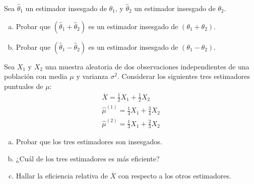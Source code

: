 \documentclass[12pt]{article}\usepackage[]{graphicx}\usepackage[]{color}
\begin{document}
\begin{prob}
Sea $\hat{\theta}_{1}$ un estimador insesgado de $\theta_{1}$, y
$\hat{\theta}_{2}$ un estimador insesgado de $\theta_{2}$.
\begin{enumerate}[a)]
\item Probar que $(\hat{\theta}_{1}+\hat{\theta}_{2})$ es un
estimador insesgado de $(\theta_{1}+\theta_{2})$.
\item  Probar que $(\hat{\theta}_{1}-\hat{\theta}_{2})$ es un
estimador insesgado de $(\theta_{1}-\theta_{2})$.
\end{enumerate}
\end{prob}

\begin{prob}
Sea $X_{1}$ y $X_{2}$ una muestra aleatoria de dos observaciones
independientes de
una población con media $\mu$ y varianza $\sigma^2$. Considerar los
siguientes tres estimadores puntuales de $\mu$:
$$\begin{array}{l}
\overline{X}=\frac{1}{2} X_{1}+\frac{1}{2} X_{2}\\
\hat{\mu}^{(1)}=\frac{1}{4}X_{1}+\frac{3}{4} X_{2}\\
\hat{\mu}^{(2)}=\frac{1}{3}X_{1}+\frac{2}{3} X_{2}
\end{array}
$$
\begin{enumerate}[a)]
\item Probar que los tres estimadores son insesgados.
\item ¿Cuál de los tres estimadores es más eficiente?
\item Hallar la eficiencia relativa de $\overline{X}$ con respecto
a los otros estimadores.
\end{enumerate}
\end{prob}
\end{document}

